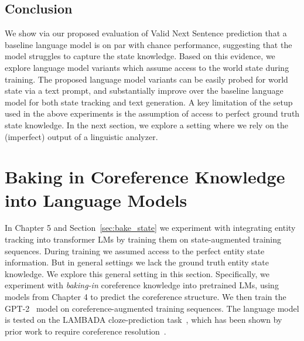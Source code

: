 \documentclass[12pt]{thesis-umich}[thesis]
\begin{document}
\subsection{Conclusion}
We show via our proposed evaluation of Valid Next Sentence prediction that a baseline language model is on par with chance performance, suggesting that the model struggles to capture the state knowledge. 
Based on this evidence, we explore language model variants which assume access to the world state during training.   
The proposed language model variants can be easily probed for world state via a text prompt, and substantially improve over the baseline language model for both state tracking and text generation.
A key limitation of the setup used in the above experiments is the  assumption of access to perfect ground truth state knowledge. 
In the next section, we explore a setting where we rely on the (imperfect) output of a linguistic analyzer. 


 \section{Baking in Coreference Knowledge into Language Models}
\label{sec:coref_lm}
In Chapter 5 and Section~\ref{sec:bake_state} we experiment with integrating entity tracking into transformer LMs by training them on state-augmented training sequences. During training we assumed access to the perfect entity state information. But in general settings we lack the ground truth entity state knowledge. 
We explore this general setting in this section.  
Specifically, we experiment with \emph{baking-in} coreference knowledge into pretrained LMs, using models from Chapter 4 to predict the coreference structure. 
We then train the GPT-2~\cite{radford2019language} model on coreference-augmented training sequences. 
The language model is tested on the LAMBADA cloze-prediction task~\cite{paperno-etal-2016-lambada}, which has been shown by prior work to require coreference resolution~\cite{chu-etal-2017-broad}. 
\end{document}
